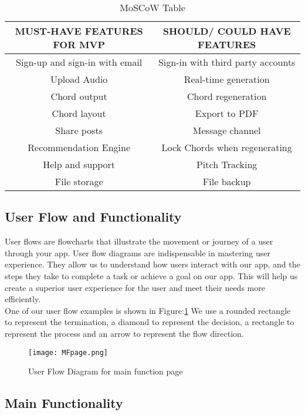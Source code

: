 \begin{table}[ht]
\centering
\begin{tabular}{ |c|c| } 
 \hline
\textbf{MUST-HAVE FEATURES FOR MVP} & \textbf{SHOULD/ COULD HAVE FEATURES}\\ 
 \hline
 Sign-up and sign-in with email & Sign-in with third party accounts \\ 
 \hline
 Upload Audio & Real-time generation \\ 
 \hline
 Chord output & Chord regeneration \\ 
 \hline
 Chord layout &  Export to PDF \\ 
 \hline
 Share posts & Message channel \\ 
 \hline
 Recommendation Engine &  Lock Chords when regenerating\\ 
 \hline
 Help and support &  Pitch Tracking\\ 
 \hline
 File storage& File backup \\ 
 \hline
 \end{tabular}
 \caption{MoSCoW Table}
 \centering
 \label{moscow}
 \end{table}
 
 \subsection{User Flow and Functionality}
User flows are flowcharts that illustrate the movement or journey of a user through your app. User flow diagrams are indispensable in mastering user experience. 
They allow us to understand how users interact with our app, and the steps they take to complete a task or achieve a goal on our app. This will help us create a superior user experience for the user and meet their needs more efficiently.  
\\One of our user flow examples is shown in Figure:\ref{flowchartmain}
We use a rounded rectangle to represent the termination, a diamond to represent the decision, a rectangle to represent the process and an arrow to represent the flow direction.

\begin{figure}[ht]
\centering
\texttt{[image: MFpage.png]}
\caption{User Flow Diagram for main function page}
\label{flowchartmain}
\end{figure}


\subsection*{Main Functionality}

